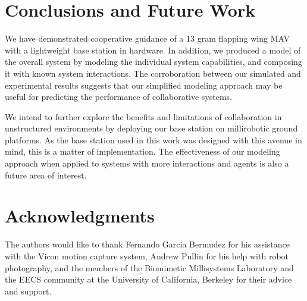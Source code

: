 \documentclass{aamas2013}
\begin{document}
\section{Conclusions and Future Work}
We have demonstrated cooperative guidance of a 13 gram flapping wing MAV with a
lightweight base station in hardware. In addition, we produced a model of the
overall system by modeling the individual system capabilities, and composing
it with known system interactions. The corroboration between our simulated and
experimental results suggests that our simplified modeling approach may be useful for 
predicting the performance of collaborative systems.

We intend to further explore the benefits and limitations of collaboration in
unstructured environments by deploying our base station on millirobotic ground
platforms. As the base station used in this work was designed with this avenue
in mind, this is a matter of implementation. The effectiveness of our modeling
approach when applied to systems with more interactions and agents is also
a future area of interest. 

\section{Acknowledgments}
The authors would like to thank Fernando Garcia Bermudez for his 
assistance with the Vicon motion capture system, Andrew Pullin for his 
help with robot photography, and the members of the Biomimetic 
Millisystems Laboratory and the EECS community at the University of 
California, Berkeley for their advice and support.






\end{document}

